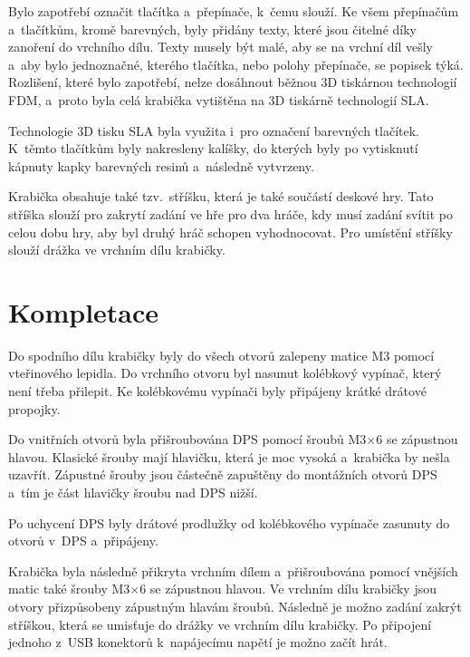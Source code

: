Bylo zapotřebí označit tlačítka a~přepínače, k~čemu slouží. Ke všem přepínačům a~tlačítkům, kromě barevných, byly přidány texty, které jsou čitelné 
díky zanoření do vrchního dílu. Texty musely být malé, aby se na vrchní díl vešly a~aby bylo jednoznačné, kterého tlačítka, nebo polohy přepínače, se 
popisek týká. Rozlišení, které bylo zapotřebí, nelze dosáhnout běžnou 3D tiskárnou technologií FDM, a~proto byla celá krabička vytištěna na 3D tiskárně 
technologií SLA.

Technologie 3D tisku SLA byla využita i~pro označení barevných tlačítek. K~těmto tlačítkům byly nakresleny kalíšky, do kterých byly po vytisknutí kápnuty
kapky barevných resinů a~následně vytvrzeny. 

Krabička obsahuje také tzv.~stříšku, která je také součástí deskové hry. Tato stříška slouží pro zakrytí zadání ve hře pro dva hráče, kdy 
musí zadání svítit po celou dobu hry, aby byl druhý hráč schopen vyhodnocovat. Pro umístění stříšky slouží drážka ve vrchním dílu krabičky.


\chapter{Kompletace} 
Do spodního dílu krabičky byly do všech otvorů zalepeny matice M3 pomocí vteřinového lepidla. Do vrchního otvoru byl nasunut kolébkový vypínač, který
není třeba přilepit. Ke kolébkovému vypínači byly připájeny krátké drátové propojky.  

Do vnitřních otvorů byla přišroubována DPS pomocí šroubů M3$\times$6 se zápustnou hlavou. Klasické šrouby mají hlavičku, která je moc vysoká a~krabička 
by nešla uzavřít. Zápustné šrouby jsou částečně zapuštěny do montážních otvorů DPS a~tím je část hlavičky šroubu nad DPS nižší. 

Po uchycení DPS byly drátové prodlužky od kolébkového vypínače zasunuty do otvorů v~DPS a~připájeny.

Krabička byla následně přikryta vrchním dílem a~přišroubována pomocí vnějších matic také šrouby M3$\times$6 se zápustnou hlavou. Ve vrchním dílu krabičky 
jsou otvory přizpůsobeny zápustným hlavám šroubů. Následně je možno zadání zakrýt stříškou, která se umisťuje do drážky ve vrchním dílu krabičky.
Po připojení jednoho z~USB konektorů k~napájecímu napětí je možno začít hrát.  
